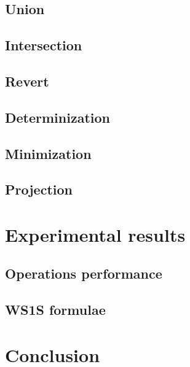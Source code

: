 \documentclass[pdflatex,sn-mathphys-num]{sn-jnl}%
\theoremstyle{thmstyleone}%
\theoremstyle{thmstyletwo}%
\theoremstyle{thmstylethree}%
\begin{document}
    \subsection{Union}
    \subsection{Intersection}
    \subsection{Revert}
    \subsection{Determinization}
    \subsection{Minimization}
    \subsection{Projection}

\section{Experimental results}
    \subsection{Operations performance}
    \subsection{WS1S formulae}

\section{Conclusion}






\end{document}
